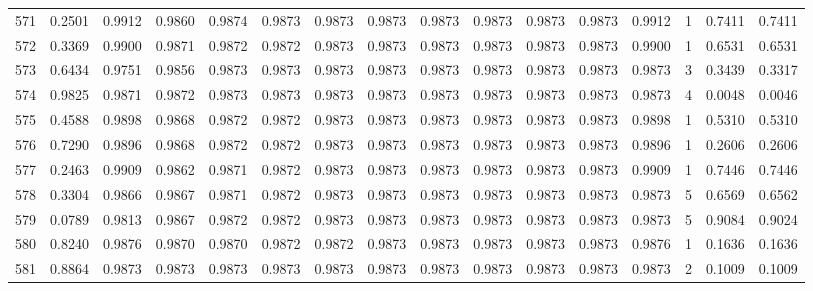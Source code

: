 \begin{tabular}{lrrrrrrrrrrrrrrr}
571 &      0.2501 &  0.9912 &  0.9860 &  0.9874 &  0.9873 &  0.9873 &  0.9873 &  0.9873 &  0.9873 &  0.9873 &   0.9873 &     0.9912 &      1 &                    0.7411 &                     0.7411 \\
572 &      0.3369 &  0.9900 &  0.9871 &  0.9872 &  0.9872 &  0.9873 &  0.9873 &  0.9873 &  0.9873 &  0.9873 &   0.9873 &     0.9900 &      1 &                    0.6531 &                     0.6531 \\
573 &      0.6434 &  0.9751 &  0.9856 &  0.9873 &  0.9873 &  0.9873 &  0.9873 &  0.9873 &  0.9873 &  0.9873 &   0.9873 &     0.9873 &      3 &                    0.3439 &                     0.3317 \\
574 &      0.9825 &  0.9871 &  0.9872 &  0.9873 &  0.9873 &  0.9873 &  0.9873 &  0.9873 &  0.9873 &  0.9873 &   0.9873 &     0.9873 &      4 &                    0.0048 &                     0.0046 \\
575 &      0.4588 &  0.9898 &  0.9868 &  0.9872 &  0.9872 &  0.9873 &  0.9873 &  0.9873 &  0.9873 &  0.9873 &   0.9873 &     0.9898 &      1 &                    0.5310 &                     0.5310 \\
576 &      0.7290 &  0.9896 &  0.9868 &  0.9872 &  0.9872 &  0.9873 &  0.9873 &  0.9873 &  0.9873 &  0.9873 &   0.9873 &     0.9896 &      1 &                    0.2606 &                     0.2606 \\
577 &      0.2463 &  0.9909 &  0.9862 &  0.9871 &  0.9872 &  0.9873 &  0.9873 &  0.9873 &  0.9873 &  0.9873 &   0.9873 &     0.9909 &      1 &                    0.7446 &                     0.7446 \\
578 &      0.3304 &  0.9866 &  0.9867 &  0.9871 &  0.9872 &  0.9873 &  0.9873 &  0.9873 &  0.9873 &  0.9873 &   0.9873 &     0.9873 &      5 &                    0.6569 &                     0.6562 \\
579 &      0.0789 &  0.9813 &  0.9867 &  0.9872 &  0.9872 &  0.9873 &  0.9873 &  0.9873 &  0.9873 &  0.9873 &   0.9873 &     0.9873 &      5 &                    0.9084 &                     0.9024 \\
580 &      0.8240 &  0.9876 &  0.9870 &  0.9870 &  0.9872 &  0.9872 &  0.9873 &  0.9873 &  0.9873 &  0.9873 &   0.9873 &     0.9876 &      1 &                    0.1636 &                     0.1636 \\
581 &      0.8864 &  0.9873 &  0.9873 &  0.9873 &  0.9873 &  0.9873 &  0.9873 &  0.9873 &  0.9873 &  0.9873 &   0.9873 &     0.9873 &      2 &                    0.1009 &                     0.1009 \\

\end{tabular}
